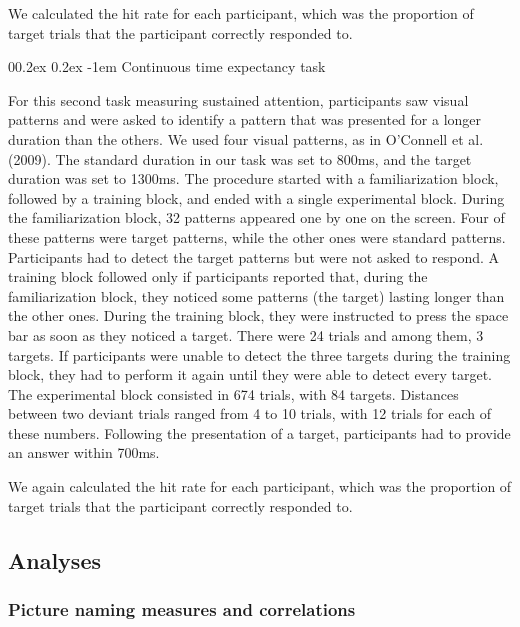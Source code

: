 \documentclass[
  man,floatsintext]{apa6}
\makeatletter
\let\oldparagraph\paragraph
\renewcommand{\paragraph}[1]{\oldparagraph{#1}\mbox{}}
\renewcommand{\paragraph}{\@startsection{paragraph}{4}{\parindent}%
  {0\baselineskip \@plus 0.2ex \@minus 0.2ex}%
  {-1em}%
  {\normalfont\normalsize\bfseries\itshape\typesectitle}}
\makeatother
\begin{document}
We calculated the hit rate for each participant, which was the proportion of target trials that the participant correctly responded to.

\hypertarget{continuous-time-expectancy-task}{%
\paragraph{Continuous time expectancy task}\label{continuous-time-expectancy-task}}

For this second task measuring sustained attention, participants saw visual patterns and were asked to identify a pattern that was presented for a longer duration than the others. We used four visual patterns, as in O'Connell et al. (2009). The standard duration in our task was set to 800ms, and the target duration was set to 1300ms. The procedure started with a familiarization block, followed by a training block, and ended with a single experimental block. During the familiarization block, 32 patterns appeared one by one on the screen. Four of these patterns were target patterns, while the other ones were standard patterns. Participants had to detect the target patterns but were not asked to respond. A training block followed only if participants reported that, during the familiarization block, they noticed some patterns (the target) lasting longer than the other ones. During the training block, they were instructed to press the space bar as soon as they noticed a target. There were 24 trials and among them, 3 targets. If participants were unable to detect the three targets during the training block, they had to perform it again until they were able to detect every target. The experimental block consisted in 674 trials, with 84 targets. Distances between two deviant trials ranged from 4 to 10 trials, with 12 trials for each of these numbers. Following the presentation of a target, participants had to provide an answer within 700ms.

We again calculated the hit rate for each participant, which was the proportion of target trials that the participant correctly responded to.

\hypertarget{analyses}{%
\subsection{Analyses}\label{analyses}}

\hypertarget{picture-naming-measures-and-correlations}{%
\subsubsection{Picture naming measures and correlations}\label{picture-naming-measures-and-correlations}}
\end{document}
